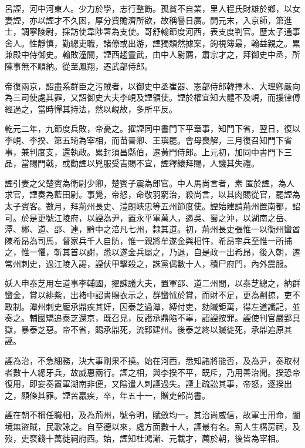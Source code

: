 \begin{pinyinscope}
 呂諲，河中河東人。少力於學，志行整飭。孤貧不自業，里人程氏財雄於鄉，以女妻諲，亦以諲才不久困，厚分貲贍濟所欲，故稱譽日廣。開元末，入京師，第進士，調寧陵尉，採訪使韋陟署為支使。哥舒翰節度河西，表支度判官。歷太子通事舍人。性靜慎，勤總吏職，諸僚或出游，諲獨頹然據案，鉤視簿最，翰益親之。累兼殿中侍御史。翰敗潼關，諲西趨靈武，由中人尉薦，肅宗才之，拜御史中丞，所陳事無不順納。從至鳳翔，遷武部侍郎。



 帝復兩京，詔盡系群臣之污賊者，以御史中丞崔器、憲部侍郎韓擇木、大理卿嚴向為三司使處其罪，又詔御史大夫李峴及諲領使。諲於權宜知大體不及峴，而援律傅經過之，當時憚其持法，然以峴故，多所平反。



 乾元二年，九節度兵敗，帝憂之。擢諲同中書門下平章事，知門下省，翌日，復以李峴、李揆、第五琦為宰相，而苗晉卿、王璵罷。會母喪解，三月復召知門下省事，兼判度支，還執政。累封須昌縣伯，遷黃門侍郎。上元初，加同中書門下三品，當賜門戟，或勸諲以兇服受吉賜不宜，諲釋縗拜賜，人譏其失禮。



 諲引妻之父楚賓為衛尉少卿，楚賓子震為郎官。中人馬尚言者，素匿於諲，為人求官，諲奏為藍田尉。事覺，帝怒，命敬羽窮治，殺尚言，以其肉賜從官，罷諲為太子賓客。數月，拜荊州長史、澧朗峽忠等五州節度使。諲始建請荊州置南都，詔可。於是更號江陵府，以諲為尹，置永平軍萬人，遏吳、蜀之沖，以湖南之岳、潭、郴、道、邵、連，黔中之涪凡七州，隸其道。初，荊州長史張惟一以衡州蠻酋陳希昂為司馬，督家兵千人自防，惟一親將牟遂金與相忤，希昂率兵至惟一所捕之，惟一懼，斬其首以謝，悉以遂金兵屬之，乃退，自是政一出希昂，後入朝，遷常州刺史，過江陵入謁，諲伏甲擊殺之，誅黨偶數十人，積尸府門，內外震服。



 妖人申泰芝用左道事李輔國，擢諫議大夫，置軍邵、道二州間，以泰芝總之，納群蠻金，賞以緋紫，出褚中詔書賜衣示之，群蠻怵於賞，而財不足，更為剽掠，吏不敢制。潭州刺史龐承鼎疾其奸，因泰芝過潭，縛付吏，劾贓鉅萬，得左道讖記，並奏之。輔國矯追泰芝還京，既召見，反譖承鼎陷不辜，詔諲按罪。諲使判官嚴郢具獄，暴泰芝惡。帝不省，賜承鼎死，流郢建州。後泰芝終以贓徙死，承鼎追原其誣。



 諲為治，不急細務，決大事剛果不撓。始在河西，悉知諸將能否，及為尹，奏取材者數十人總牙兵，故威惠兩行。諲之相，與李揆不平，既斥，乃用善治聞。揆恐帝復用，即妄奏置軍湖南非便，又陰遣人刺諲過失。諲上疏訟其事，帝怒，逐揆出之，顯條其罪。諲苦羸疾，卒，年五十一，贈吏部尚書。



 諲在朝不稱任職相，及為荊州，號令明，賦斂均一。其治尚威信，故軍士用命，闔境無盜賊，民歌詠之。自至德以來，處方面數十人，諲最有名。荊人生構房祠，及歿，吏裒錢十萬徙祠府西。始，諲知杜鴻漸、元載才，薦於朝，後皆為宰相。




\end{pinyinscope}
